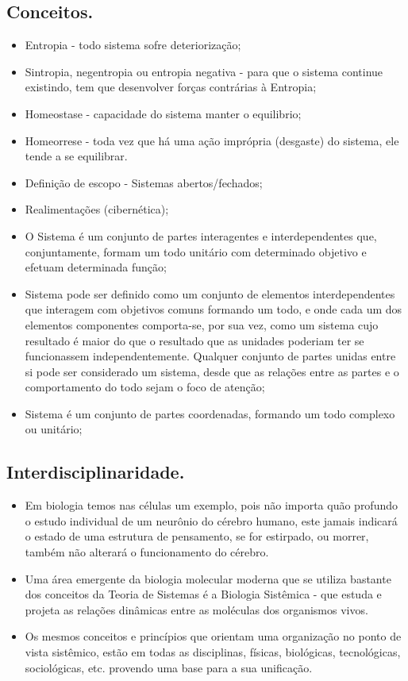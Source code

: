 \documentclass[a4paper,12pt]{article}
\begin{document}
\subsection{Conceitos.}
\begin{itemize}
\item Entropia - todo sistema sofre deteriorização;
\item Sintropia, negentropia ou entropia negativa - para que o sistema continue existindo, tem que desenvolver forças contrárias à Entropia;
\item Homeostase - capacidade do sistema manter o equilibrio;
\item Homeorrese - toda vez que há uma ação imprópria (desgaste) do sistema, ele tende a se equilibrar.
\item Definição de escopo - Sistemas abertos/fechados;
\item Realimentações (cibernética);
\item O Sistema é um conjunto de partes interagentes e interdependentes que, conjuntamente, formam um todo unitário com determinado objetivo e efetuam determinada função;
\item Sistema pode ser definido como um conjunto de elementos interdependentes que interagem com objetivos comuns formando um todo, e onde cada um dos elementos componentes comporta-se, por sua vez, como um sistema cujo resultado é maior do que o resultado que as unidades poderiam ter se funcionassem independentemente. Qualquer conjunto de partes unidas entre si pode ser considerado um sistema, desde que as relações entre as partes e o comportamento do todo sejam o foco de atenção;
\item Sistema é um conjunto de partes coordenadas, formando um todo complexo ou unitário;
\end{itemize}


\subsection{Interdisciplinaridade.}
\begin{itemize}
\item Em biologia temos nas células um exemplo, pois não importa quão profundo o estudo individual de um neurônio do cérebro humano, este jamais indicará o estado de uma estrutura de pensamento, se for estirpado, ou morrer, também não alterará o funcionamento do cérebro.
\item Uma área emergente da biologia molecular moderna que se utiliza bastante dos conceitos da Teoria de Sistemas é a Biologia Sistêmica - que estuda e projeta as relações dinâmicas entre as moléculas dos organismos vivos.
\item Os mesmos conceitos e princípios que orientam uma organização no ponto de vista sistêmico, estão em todas as disciplinas, físicas, biológicas, tecnológicas, sociológicas, etc. provendo uma base para a sua unificação.
\end{itemize}
\end{document}
